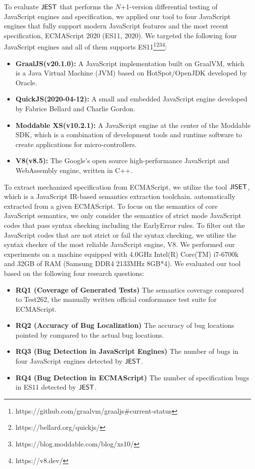 To evaluate $\tool$ that performs the $N$+1-version differential testing of JavaScript
engines and specification, we applied our tool to four JavaScript engines that
fully support modern JavaScript features and the most recent specification,
ECMAScript 2020 (ES11, 2020).  We targeted the following four JavaScript
engines and all of them supports
ES11\footnote{https://github.com/graalvm/graaljs\#current-status}\footnote{https://bellard.org/quickjs/}\footnote{https://blog.moddable.com/blog/xs10/}\footnote{https://v8.dev/}:
\begin{itemize}
  \item \textbf{GraalJS(v20.1.0):} A JavaScript implementation built on
    GraalVM\cite{graaljs}, which is a Java Virtual Machine (JVM) based on
    HotSpot/OpenJDK developed by Oracle.
  \item \textbf{QuickJS(2020-04-12):} A small and embedded JavaScript engine developed by
    Fabrice Bellard and Charlie Gordon\cite{qjs}.
  \item \textbf{Moddable XS(v10.2.1):} A JavaScript engine at the center of the Moddable
    SDK\cite{xs}, which is a combination of development tools and runtime
    software to create applications for micro-controllers.
  \item \textbf{V8(v8.5):} The Google's open source high-performance JavaScript and
    WebAssembly engine\cite{v8}, written in C++.
\end{itemize}
To extract mechanized specification from ECMAScript, we utilize the tool
$\jiset$, which is a JavaScript IR-based semantics extraction toolchain.
automatically extracted from a given ECMAScript.  To focus on the semantics of
core JavaScript semantics, we only consider the semantics of strict mode
JavaScript codes that pass syntax checking including the EarlyError rules.  To
filter out the JavaScript codes that are not strict or fail the syntax checking,
we utilize the syntax checker of the most reliable JavaScript engine, V8.
We performed our experiments on a machine equipped with 4.0GHz Intel(R) Core(TM)
i7-6700k and 32GB of RAM (Samsung DDR4 2133MHz 8GB*4).  We evaluated our tool
based on the following four research questions:
\begin{itemize}
  \item {\bf RQ1 (Coverage of Generated Tests)} The semantics coverage compared
    to Test262, the manually written official conformance test suite for
    ECMAScript.
  \item {\bf RQ2 (Accuracy of Bug Localization)} The accuracy of bug locations
    pointed by  compared to the actual bug locations.
  \item {\bf RQ3 (Bug Detection in JavaScript Engines)} The number of bugs in
    four JavaScript engines detected by $\tool$.
  \item {\bf RQ4 (Bug Detection in ECMAScript)} The number of specification bugs
    in ES11 detected by $\tool$.
\end{itemize}


